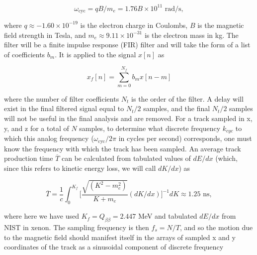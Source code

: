 \documentclass{JINST}
\begin{document}

\begin{equation}\label{eqn_wcyc}
\omega_{\mathrm{cyc}} = qB/m_{e} = 1.76B \times 10^{11} \,\, \mathrm{rad/s},
\end{equation}

\noindent where $q \approx -1.60 \times 10^{-19}$ is the electron charge in Coulombs, $B$ is the magnetic field
strength in Tesla, and $m_{e} \approx 9.11 \times 10^{-31}$ is the electron mass in kg.  The filter will be a finite impulse
response (FIR) filter and will take the form of a  list of coefficients $b_{m}$.  It is applied to the signal $x[n]$ as

\begin{equation}
x_{f}[n] = \sum_{m=0}^{N_f} b_{m}x[n-m]
\end{equation}

\noindent where the number of filter coefficients $N_{t}$ is the order of the filter.  A delay will exist in the
final filtered signal equal to $N_{t}/2$ samples, and the final $N_{t}/2$ samples will not be useful in the final analysis
and are removed.
For a track sampled in x, y, and z for a total of $N$ samples, to determine what discrete frequency $k_{cyc}$ to which
this analog frequency ($\omega_{\mathrm{cyc}}/2\pi$ in cycles per second) corresponds, one must know the frequency 
with which the track has been sampled.  An average track production time $\overline{T}$ can be calculated from 
tabulated values of $dE/dx$ (which, since this refers to kinetic energy loss, we will call $dK/dx$) as

\begin{equation}\label{eqn_T}
\overline{T} = \frac{1}{c}\int_{0}^{K_{f}} \biggl[\frac{\sqrt{(K^2-m_e^2)}}{K+m_e}(dK/dx)\biggr]^{-1} dK \approx 1.25 \,\, \mathrm{ns},
\end{equation}

\noindent where here we have used $K_{f} = Q_{\beta\beta} = 2.447$ MeV and tabulated 
$dE/dx$ from NIST \cite{NIST_mac} in xenon.  The sampling frequency is then $f_{s} = N/T$, and so the motion
due to the magnetic field should manifest itself in the arrays of sampled x and y coordinates
of the track as a sinusoidal component of discrete frequency 
\end{document}
